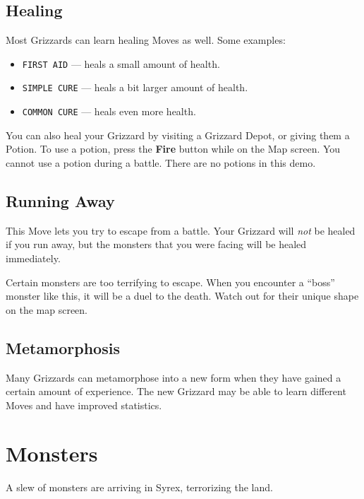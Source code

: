 \documentclass[9pt,twocolumn,openany,article]{memoir}
\newenvironment{ritemize}{\begin{itemize}\raggedright}{\end{itemize}}
\begin{document}

\section{Healing}

Most Grizzards can learn healing Moves as well. Some examples:

\begin{ritemize}
\item \texttt{FIRST AID} --- heals a small amount of health.
\item \texttt{SIMPLE CURE} --- heals a bit larger amount of health.
\item \texttt{COMMON CURE} --- heals even more health.
\end{ritemize}

You can also heal your Grizzard  by visiting a Grizzard Depot, or giving
them a Potion. To use a  potion, press the \textbf{Fire} button while on
the Map screen. You cannot use a potion during a battle. \ifdefined\DEMO
There are no potions in this demo. \fi

\section{Running Away}

This  Move lets  you try  to escape  from a  battle. Your  Grizzard will
\emph{not} be  healed if you  run away, but  the monsters that  you were
facing will be healed immediately.

Certain  monsters  are too  terrifying  to  escape. When  you  encounter
a ``boss'' monster like this, it will  be a duel to the death. Watch out
for their unique shape on the map screen.

\section{Metamorphosis}

Many Grizzards  can metamorphose into a  new form when they  have gained
a certain  amount of experience. The  new Grizzard may be  able to learn
different Moves and have improved statistics.

\chapter{Monsters}

A slew of monsters are arriving in Syrex, terrorizing the land.
\end{document}
